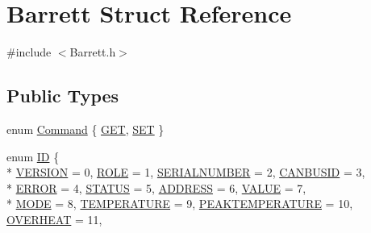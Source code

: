 \hypertarget{struct_barrett}{\section{Barrett Struct Reference}
\label{struct_barrett}
}


{\ttfamily \#include $<$Barrett.\-h$>$}

\subsection*{Public Types}
\begin{DoxyCompactItemize}
\item 
enum \hyperlink{struct_barrett_abbf4a39cfafcb46bd73c64dc3c2fcd9c}{Command} \{ \hyperlink{struct_barrett_abbf4a39cfafcb46bd73c64dc3c2fcd9caf578b43d6ffa23cfd7930e2bad8781cb}{G\-E\-T}, 
\hyperlink{struct_barrett_abbf4a39cfafcb46bd73c64dc3c2fcd9ca0a2114290bcdc20151eebb58d589d351}{S\-E\-T}
 \}
\item 
enum \hyperlink{struct_barrett_a317dfaed9982ffc28166e537d774bd16}{I\-D} \{ \\*
\hyperlink{struct_barrett_a317dfaed9982ffc28166e537d774bd16a9abc12ac78518534ff22e4a43aa0ab88}{V\-E\-R\-S\-I\-O\-N} = 0, 
\hyperlink{struct_barrett_a317dfaed9982ffc28166e537d774bd16a575ff7711ff4a75e9133d58dfa8aa278}{R\-O\-L\-E} = 1, 
\hyperlink{struct_barrett_a317dfaed9982ffc28166e537d774bd16afeeec004b4aabc1504226c6ee672d1cc}{S\-E\-R\-I\-A\-L\-N\-U\-M\-B\-E\-R} = 2, 
\hyperlink{struct_barrett_a317dfaed9982ffc28166e537d774bd16a64fc31ec4c4908f8d8cf39414fff8414}{C\-A\-N\-B\-U\-S\-I\-D} = 3, 
\\*
\hyperlink{struct_barrett_a317dfaed9982ffc28166e537d774bd16a37ba75f40c6f0737071a8bfc65e28717}{E\-R\-R\-O\-R} = 4, 
\hyperlink{struct_barrett_a317dfaed9982ffc28166e537d774bd16a280784cdd7381cf1ae2f9d5b69341861}{S\-T\-A\-T\-U\-S} = 5, 
\hyperlink{struct_barrett_a317dfaed9982ffc28166e537d774bd16a76a1ef6c54cc1912fafb40a2b4fa2180}{A\-D\-D\-R\-E\-S\-S} = 6, 
\hyperlink{struct_barrett_a317dfaed9982ffc28166e537d774bd16a9f874a9daf7180dc2361e05b929d062d}{V\-A\-L\-U\-E} = 7, 
\\*
\hyperlink{struct_barrett_a317dfaed9982ffc28166e537d774bd16a324e5897910aa60f3a0bdb95cb6d554e}{M\-O\-D\-E} = 8, 
\hyperlink{struct_barrett_a317dfaed9982ffc28166e537d774bd16a662a783c4eb8483381e3bc843b385ad7}{T\-E\-M\-P\-E\-R\-A\-T\-U\-R\-E} = 9, 
\hyperlink{struct_barrett_a317dfaed9982ffc28166e537d774bd16a12b74854b9e84c2c795a970fca8638cf}{P\-E\-A\-K\-T\-E\-M\-P\-E\-R\-A\-T\-U\-R\-E} = 10, 
\hyperlink{struct_barrett_a317dfaed9982ffc28166e537d774bd16a2041fef8569eac3d04b8045914d0d73a}{O\-V\-E\-R\-H\-E\-A\-T} = 11, 

\end{DoxyCompactItemize}

